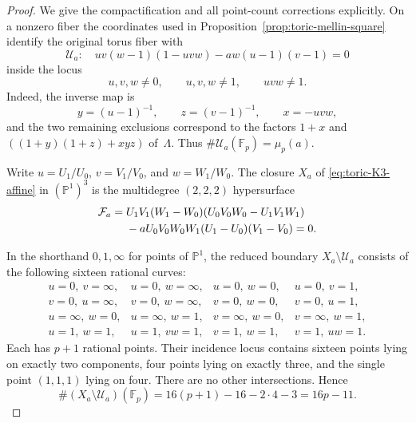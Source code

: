 \begin{proof}
We give the compactification and all point-count corrections explicitly.
On a nonzero fiber the coordinates used in
Proposition~\ref{prop:toric-mellin-square} identify the original torus fiber
with
\begin{equation}
 \mathcal U_a:\quad
 uv(w-1)(1-uvw)-aw(u-1)(v-1)=0
 \label{eq:toric-K3-affine}
\end{equation}
inside the locus
\[
 u,v,w\ne0,\qquad u,v,w\ne1,\qquad uvw\ne1.
\]
Indeed, the inverse map is
\[
 y=(u-1)^{-1},\qquad z=(v-1)^{-1},\qquad x=-uvw,
\]
and the two remaining exclusions correspond to the factors $1+x$ and
$((1+y)(1+z)+xyz)$ of~$\Lambda$.  Thus
$\#\mathcal U_a(\mathbb F_p)=\mu_p(a)$.

Write $u=U_1/U_0$, $v=V_1/V_0$, and $w=W_1/W_0$.  The closure $X_a$ of
\eqref{eq:toric-K3-affine} in $(\mathbb P^1)^3$ is the multidegree
$(2,2,2)$ hypersurface
\begin{align}
 \mathcal F_a={}&
 U_1V_1(W_1-W_0)(U_0V_0W_0-U_1V_1W_1) \notag\\
 &-aU_0V_0W_0W_1(U_1-U_0)(V_1-V_0)=0.
 \label{eq:toric-K3-homogeneous}
\end{align}

In the shorthand $0,1,\infty$ for points of $\mathbb P^1$, the reduced
boundary $X_a\setminus\mathcal U_a$ consists of the following sixteen
rational curves:
\begin{equation}
\begin{array}{llll}
 u=0,\ v=\infty,&u=0,\ w=\infty,&u=0,\ w=0,&u=0,\ v=1,\\
 v=0,\ u=\infty,&v=0,\ w=\infty,&v=0,\ w=0,&v=0,\ u=1,\\
 u=\infty,\ w=0,&u=\infty,\ w=1,
 &v=\infty,\ w=0,&v=\infty,\ w=1,\\
 u=1,\ w=1,&u=1,\ vw=1,
 &v=1,\ w=1,&v=1,\ uw=1.
\end{array}
\label{eq:toric-K3-boundary-curves}
\end{equation}
Each has $p+1$ rational points.  Their incidence locus contains sixteen
points lying on exactly two components, four points lying on exactly three,
and the single point $(1,1,1)$ lying on four.  There are no other
intersections.  Hence
\begin{equation}
 \#(X_a\setminus\mathcal U_a)(\mathbb F_p)
 =16(p+1)-16-2\cdot4-3=16p-11.
 \label{eq:toric-K3-boundary-count}
\end{equation}


\end{proof}
